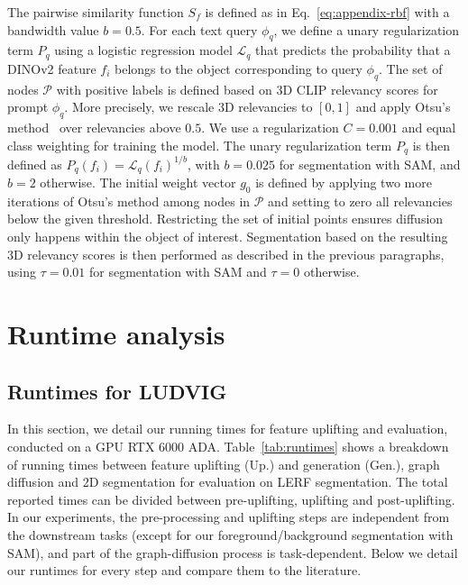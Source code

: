 The pairwise similarity function $S_f$ is defined as in Eq.~\ref{eq:appendix-rbf} with a bandwidth value $b=0.5$. For each text query $\phi_q$, we define a unary regularization term $P_q$ using a logistic regression model $\mathcal{L}_q$ that predicts the probability that a DINOv2 feature $f_i$ belongs to the object corresponding to query $\phi_q$. The set of nodes $\mathcal{P}$ with positive labels is defined based on 3D CLIP relevancy scores for prompt $\phi_q$. More precisely, we rescale 3D relevancies to $[0,1]$ and apply Otsu's method~\citep{otsu1975threshold} over relevancies above $0.5$. We use a regularization $C=0.001$ and equal class weighting for training the model.
The unary regularization term $P_q$ is then defined as $P_q(f_i) = \mathcal{L}_q(f_i)^{1/b}$, with $b=0.025$ for segmentation with SAM, and $b=2$ otherwise.
The initial weight vector $g_0$ is defined by applying two more iterations of Otsu's method among nodes in $\mathcal{P}$ and setting to zero all relevancies below the given threshold. Restricting the set of initial points ensures diffusion only happens within the object of interest. Segmentation based on the resulting 3D relevancy scores is then performed as described in the previous paragraphs, using $\tau=0.01$ for segmentation with SAM and $\tau=0$ otherwise. 




\section{Runtime analysis}

\subsection{Runtimes for LUDVIG}
\label{sec:appendix-runtime}

In this section, we detail our running times for feature uplifting and evaluation, conducted on a GPU RTX 6000 ADA. Table~\ref{tab:runtimes} shows a breakdown of running times between feature uplifting (Up.) and generation (Gen.), graph diffusion and 2D segmentation for evaluation on LERF segmentation. 
The total reported times can be divided between pre-uplifting, uplifting and post-uplifting. In our experiments, the pre-processing and uplifting steps are independent from the downstream tasks (except for our foreground/background segmentation with SAM), and part of the graph-diffusion process is task-dependent. Below we detail our runtimes for every step and compare them to the literature.

